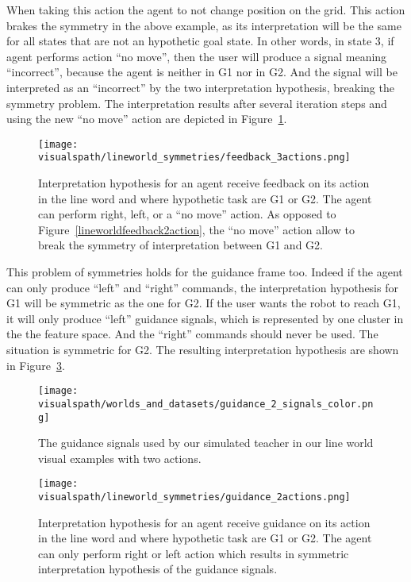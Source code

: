 When taking this action the agent to not change position on the grid. This action brakes the symmetry in the above example, as its interpretation will be the same for all states that are not an hypothetic goal state. In other words, in state 3, if agent performs action ``no move'', then the user will produce a signal meaning ``incorrect'', because the agent is neither in G1 nor in G2. And the signal will be interpreted as an ``incorrect'' by the two interpretation hypothesis, breaking the symmetry problem. The interpretation results after several iteration steps and using the new ``no move'' action are depicted in Figure~\ref{fig:lineworldfeedback3action}.

\begin{figure}[!ht]
  \centering
  \texttt{[image: \\visualspath/lineworld\_symmetries/feedback\_3actions.png]}
  \caption{Interpretation hypothesis for an agent receive feedback on its action in the line word and where hypothetic task are G1 or G2. The agent can perform right, left, or a ``no move'' action. As opposed to Figure~\ref{lineworldfeedback2action}, the ``no move'' action allow to break the symmetry of interpretation between G1 and G2.}
  \label{fig:lineworldfeedback3action}
\end{figure}

This problem of symmetries holds for the guidance frame too. Indeed if the agent can only produce ``left'' and ``right'' commands, the interpretation hypothesis for G1 will be symmetric as the one for G2. If the user wants the robot to reach G1, it will only produce ``left'' guidance signals, which is represented by one cluster in the the feature space. And the ``right'' commands should never be used. The situation is symmetric for G2. The resulting interpretation hypothesis are shown in Figure~\ref{fig:lineworldguidance2action}.

\begin{figure}[!ht]
  \centering
  \texttt{[image: \\visualspath/worlds\_and\_datasets/guidance\_2\_signals\_color.png]}
  \caption{The guidance signals used by our simulated teacher in our line world visual examples with two actions.}
  \label{fig:lineworldguidance2signals}
\end{figure}

\begin{figure}[!ht]
  \centering
  \texttt{[image: \\visualspath/lineworld\_symmetries/guidance\_2actions.png]}
  \caption{Interpretation hypothesis for an agent receive guidance on its action in the line word and where hypothetic task are G1 or G2. The agent can only perform right or left action which results in symmetric interpretation hypothesis of the guidance signals.}
  \label{fig:lineworldguidance2action}
\end{figure}

